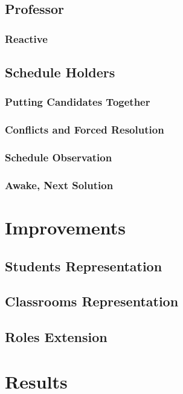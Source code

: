 \documentclass{beamer}
\begin{document}
\subsection{Professor}
\subsubsection{Reactive}

\subsection{Schedule Holders}
\subsubsection{Putting Candidates Together}
\subsubsection{Conflicts and Forced Resolution}
\subsubsection{Schedule Observation}
\subsubsection{Awake, Next Solution}

\section{Improvements}
\subsection{Students Representation}
\subsection{Classrooms Representation}
\subsection{Roles Extension}

\section{Results}
\end{document}
